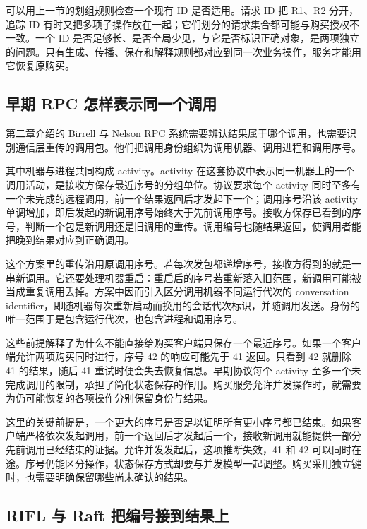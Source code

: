 可以用上一节的划组规则检查一个现有 ID 是否适用。请求 ID 把 R1、R2 分开，追踪 ID 有时又把多项子操作放在一起；它们划分的请求集合都可能与购买授权不一致。一个 ID 是否足够长、是否全局少见，与它是否标识正确对象，是两项独立的问题。只有生成、传播、保存和解释规则都对应到同一次业务操作，服务才能用它恢复原购买。

\subsection*{早期 RPC 怎样表示同一个调用}

第二章介绍的 Birrell 与 Nelson RPC 系统需要辨认结果属于哪个调用，也需要识别通信层重传的调用包。他们把调用身份组织为调用机器、调用进程和调用序号\cite{rpc}。

其中机器与进程共同构成 activity。activity 在这套协议中表示同一机器上的一个调用活动，是接收方保存最近序号的分组单位。协议要求每个 activity 同时至多有一个未完成的远程调用，前一个结果返回后才发起下一个；调用序号沿该 activity 单调增加，即后发起的新调用序号始终大于先前调用序号。接收方保存已看到的序号，判断一个包是新调用还是旧调用的重传。调用编号也随结果返回，使调用者能把晚到结果对应到正确调用。

这个方案里的重传沿用原调用序号。若每次发包都递增序号，接收方得到的就是一串新调用。它还要处理机器重启：重启后的序号若重新落入旧范围，新调用可能被当成重复调用丢掉。方案中因而引入区分调用机器不同运行代次的 conversation identifier，即随机器每次重新启动而换用的会话代次标识，并随调用发送。身份的唯一范围于是包含运行代次，也包含进程和调用序号。

这些前提解释了为什么不能直接给购买客户端只保存一个最近序号。如果一个客户端允许两项购买同时进行，序号 42 的响应可能先于 41 返回。只看到 42 就删除 41 的结果，随后 41 重试时便会失去恢复信息。早期协议每个 activity 至多一个未完成调用的限制，承担了简化状态保存的作用。购买服务允许并发操作时，就需要为仍可能恢复的各项操作分别保留身份与结果。



这里的关键前提是，一个更大的序号是否足以证明所有更小序号都已结束。如果客户端严格依次发起调用，前一个返回后才发起后一个，接收新调用就能提供一部分先前调用已经结束的证据。允许并发发起后，这项推断失效，41 和 42 可以同时在途。序号仍能区分操作，状态保存方式却要与并发模型一起调整。购买采用独立键时，也需要明确保留哪些尚未确认的结果。

\subsection*{RIFL 与 Raft 把编号接到结果上}

